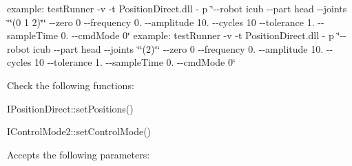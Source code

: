 example\+: test\+Runner -\/v -\/t Position\+Direct.\+dll -\/ p \char`\"{}-\/-\/robot icub -\/-\/part head -\/-\/joints \char`\"{}\char`\"{}(0 1 2)\char`\"{}\char`\"{} -\/-\/zero 0 -\/-\/frequency 0. -\/-\/amplitude 10. -\/-\/cycles 10 -\/-\/tolerance 1. -\/-\/sample\+Time 0. -\/-\/cmd\+Mode 0\char`\"{} example\+: test\+Runner -\/v -\/t Position\+Direct.\+dll -\/ p \char`\"{}-\/-\/robot icub -\/-\/part head -\/-\/joints \char`\"{}\char`\"{}(2)\char`\"{}\char`\"{} -\/-\/zero 0 -\/-\/frequency 0. -\/-\/amplitude 10. -\/-\/cycles 10 -\/-\/tolerance 1. -\/-\/sample\+Time 0. -\/-\/cmd\+Mode 0\char`\"{}

Check the following functions\+: \begin{DoxyItemize}
\item I\+Position\+Direct\+::set\+Positions() \item I\+Control\+Mode2\+::set\+Control\+Mode()\end{DoxyItemize}
Accepts the following parameters\+: \tabulinesep=1mm
